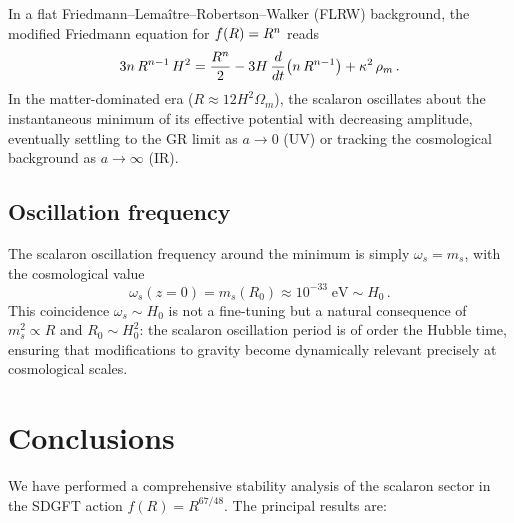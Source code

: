 \documentclass[amsmath,amssymb,aps,prd,twocolumn,superscriptaddress,nofootinbib]{revtex4-2}
\begin{document}
In a flat Friedmann--Lema\^itre--Robertson--Walker (FLRW)
background, the modified Friedmann equation for $f(R) = R^{n}$
reads
\begin{equation}
  3n\,R^{n-1}\,H^2
    = \frac{R^{n}}{2}
    - 3H\,\frac{d}{dt}\!\left(n\,R^{n-1}\right)
    + \kappa^2\,\rho_m\,.
  \label{eq:modified_friedmann}
\end{equation}
In the matter-dominated era ($R \approx 12H^2\Omega_m$), the
scalaron oscillates about the instantaneous minimum of its
effective potential with decreasing amplitude, eventually
settling to the GR limit as $a \to 0$ (UV) or tracking the
cosmological background as $a \to \infty$ (IR).

\subsection{Oscillation frequency}

The scalaron oscillation frequency around the minimum is simply
$\omega_s = m_s$, with the cosmological value
\begin{equation}
  \omega_s(z=0) = m_s(R_0) \approx 10^{-33}\;\mathrm{eV}
    \sim H_0\,.
  \label{eq:omega_scalaron}
\end{equation}
This coincidence $\omega_s \sim H_0$ is not a fine-tuning but a
natural consequence of $m_s^2 \propto R$ and
$R_0 \sim H_0^2$: the scalaron oscillation period is of order
the Hubble time, ensuring that modifications to gravity become
dynamically relevant precisely at cosmological scales.

\section{Conclusions}
\label{sec:conclusions}

We have performed a comprehensive stability analysis of the
scalaron sector in the SDGFT action $f(R) = R^{67/48}$.
The principal results are:
\end{document}
